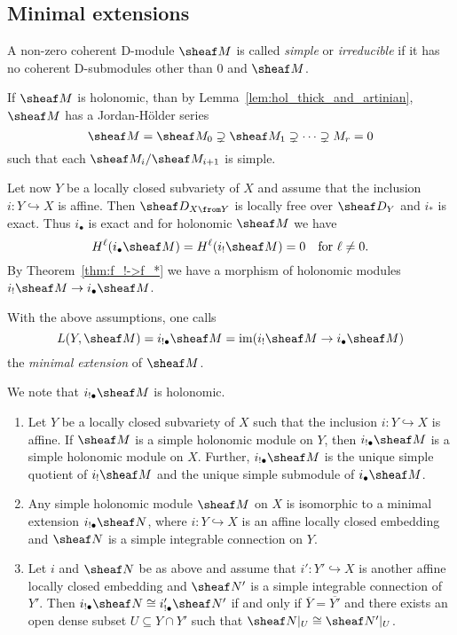\documentclass[number-in-sections,a4paper]{notes}
\begin{document}
\subsection{Minimal extensions}

\begin{Definition}
    A non-zero coherent D-module $\sheaf M$ is called \emph{simple} or \emph{irreducible} if it has no coherent D-submodules other than $0$ and $\sheaf M$.
\end{Definition}

If $\sheaf M$ is holonomic, than by Lemma~\ref{lem:hol_thick_and_artinian}, $\sheaf M$ has a Jordan-H\"older series
\[
    \sheaf M = \sheaf M_0 \supsetneq \sheaf M_1 \supsetneq \dots \supsetneq M_r = 0
\]
such that each $\sheaf M_i/\sheaf M_{i+1}$ is simple.

Let now $Y$ be a locally closed subvariety of $X$ and assume that the inclusion $i\colon Y \hookrightarrow X$ is affine.
Then $\sD_{X \from Y}$ is locally free over $\sD_Y$ and $i_*$ is exact.
Thus $i_\bullet$ is exact and for holonomic $\sheaf M$ we have
\[
    H^\ell(i_\bullet \sheaf M) = H^\ell(i_!\sheaf M) = 0 \quad\text{for } \ell \ne 0.
\]
By Theorem~\ref{thm:f_!->f_*} we have a morphism of holonomic modules $i_!\sheaf M \to i_\bullet \sheaf M$.

\begin{Definition}
    With the above assumptions, one calls
    \[
        L(Y,\sheaf M) = i_{!\bullet}\sheaf M = \im(i_!\sheaf M \to i_\bullet\sheaf M)
    \]
    the \emph{minimal extension} of $\sheaf M$.
\end{Definition}

We note that $i_{!\bullet}\sheaf M$ is holonomic.

\begin{Theorem}\leavevmode
    \begin{enumerate}
        \item Let $Y$ be a locally closed subvariety of $X$ such that the inclusion $i\colon Y \hookrightarrow X$ is affine.
            If $\sheaf M$ is a simple holonomic module on $Y$, then $i_{!\bullet}\sheaf M$ is a simple holonomic module on $X$.
            Further, $i_{!\bullet}\sheaf M$ is the unique simple quotient of $i_!\sheaf M$ and the unique simple submodule of $i_\bullet\sheaf M$.
        \item Any simple holonomic module $\sheaf M$ on $X$ is isomorphic to a minimal extension $i_{!\bullet}\sheaf N$, where $i\colon Y \hookrightarrow X$ is an affine locally closed embedding and $\sheaf N$ is a simple integrable connection on $Y$.
        \item Let $i$ and $\sheaf N$ be as above and assume that $i'\colon Y'\hookrightarrow X$ is another affine locally closed embedding and $\sheaf N'$ is a simple integrable connection of $Y'$.
            Then $i_{!\bullet}\sheaf N \cong i'_{!\bullet}\sheaf N'$ if and only if $\overline{Y} = \overline{Y'}$ and there exists an open dense subset $U \subseteq Y \cap Y'$ such that $\res{\sheaf N}{U} \cong \res{\sheaf N'}{U}$.
    \end{enumerate}
\end{Theorem}
\end{document}

